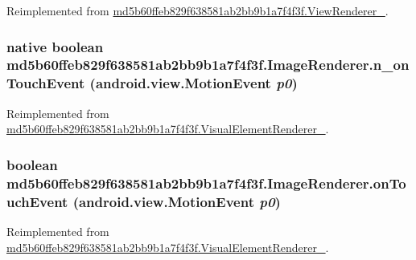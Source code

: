 Reimplemented from \hyperlink{classmd5b60ffeb829f638581ab2bb9b1a7f4f3f_1_1_view_renderer__2_dae20979ac761a65aa60c9b427509c37}{md5b60ffeb829f638581ab2bb9b1a7f4f3f.ViewRenderer\_}.\hypertarget{classmd5b60ffeb829f638581ab2bb9b1a7f4f3f_1_1_image_renderer_68e0694015ee10a62b53a937e6a39a97}{
\subsubsection[{n\_\-onTouchEvent}]{\setlength{\rightskip}{0pt plus 5cm}native boolean md5b60ffeb829f638581ab2bb9b1a7f4f3f.ImageRenderer.n\_\-onTouchEvent (android.view.MotionEvent {\em p0})}}
\label{classmd5b60ffeb829f638581ab2bb9b1a7f4f3f_1_1_image_renderer_68e0694015ee10a62b53a937e6a39a97}




Reimplemented from \hyperlink{classmd5b60ffeb829f638581ab2bb9b1a7f4f3f_1_1_visual_element_renderer__1_bf46ffd446313b87383a085a60d65dd4}{md5b60ffeb829f638581ab2bb9b1a7f4f3f.VisualElementRenderer\_}.\hypertarget{classmd5b60ffeb829f638581ab2bb9b1a7f4f3f_1_1_image_renderer_b69668a58532e4f57a389fa04e18015d}{
\subsubsection[{onTouchEvent}]{\setlength{\rightskip}{0pt plus 5cm}boolean md5b60ffeb829f638581ab2bb9b1a7f4f3f.ImageRenderer.onTouchEvent (android.view.MotionEvent {\em p0})}}
\label{classmd5b60ffeb829f638581ab2bb9b1a7f4f3f_1_1_image_renderer_b69668a58532e4f57a389fa04e18015d}




Reimplemented from \hyperlink{classmd5b60ffeb829f638581ab2bb9b1a7f4f3f_1_1_visual_element_renderer__1_3beb6d0ebf9e1eca68fed2eac13c88ac}{md5b60ffeb829f638581ab2bb9b1a7f4f3f.VisualElementRenderer\_}.

